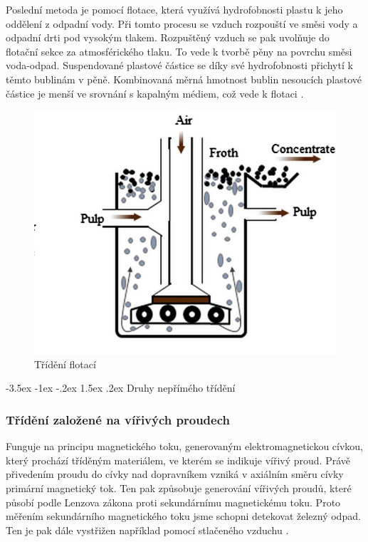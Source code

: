 \documentclass[a4paper,10pt]{article}
\makeatletter
\theoremstyle{definition}
\renewcommand\subsection{\@startsection {subsection}{1}{\z@}%
                                   {-3.5ex \@plus -1ex \@minus -.2ex}%
                                   {1.5ex \@plus.2ex}%
                                   {\normalsize\bfseries}}
\makeatother
\begin{document}
\newpage
Poslední metoda je pomocí flotace, která využívá hydrofobnosti plastu k jeho oddělení z odpadní vody. Při tomto procesu se vzduch rozpouští ve směsi vody a odpadní drti pod vysokým tlakem. Rozpuštěný vzduch se pak uvolňuje do flotační sekce za atmosférického tlaku. To vede k tvorbě pěny na povrchu směsi voda-odpad. Suspendované plastové částice se díky své hydrofobnosti přichytí k těmto bublinám v pěně. Kombinovaná měrná hmotnost bublin nesoucích plastové částice je menší ve srovnání s kapalným médiem, což vede k flotaci \cite{GUNDUPALLI201756} \cite{wang2015flotation}.\\

\begin{figure}[H]
\begin{center}
\includegraphics[scale=1]{Images/Flotace.jpg}
\caption{Třídění flotací \cite{inproceedings}}
\label{fig:1}
\end{center}
\end{figure}



\subsection{Druhy nepřímého třídění}
\label{subsec:1}
\subsubsection*{Třídění založené na vířivých proudech}
Funguje na principu magnetického toku, generovaným elektromagnetickou cívkou, který prochází tříděným materiálem, ve kterém se indikuje vířivý proud. Právě přivedením proudu do cívky nad dopravníkem vzniká v axiálním směru cívky primární magnetický tok. Ten pak způsobuje generování vířivých proudů, které působí podle Lenzova zákona proti sekundárnímu magnetickému toku. Proto měřením sekundárního magnetického toku jsme schopni detekovat železný odpad. Ten je pak dále vystřižen například pomocí stlačeného vzduchu
\cite{GUNDUPALLI201756}.
\end{document}
